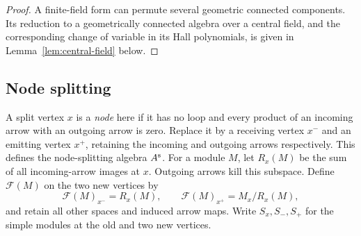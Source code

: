 \begin{proof}
A finite-field form can permute several geometric connected components. Its reduction to a geometrically connected algebra over a central field, and the corresponding change of variable in its Hall polynomials, is given in Lemma~\ref{lem:central-field} below.
\end{proof}

\subsection{Node splitting}
A split vertex $x$ is a \emph{node} here if it has no loop and every product of an incoming arrow with an outgoing arrow is zero. Replace it by a receiving vertex $x^-$ and an emitting vertex $x^+$, retaining the incoming and outgoing arrows respectively. This defines the node-splitting algebra $A^{\rm s}$. For a module $M$, let $R_x(M)$ be the sum of all incoming-arrow images at $x$. Outgoing arrows kill this subspace. Define $\mathcal F(M)$ on the two new vertices by
\[
 \mathcal F(M)_{x^-}=R_x(M),\qquad
 \mathcal F(M)_{x^+}=M_x/R_x(M),
\]
and retain all other spaces and induced arrow maps. Write $S_x,S_-,S_+$ for the simple modules at the old and two new vertices.

